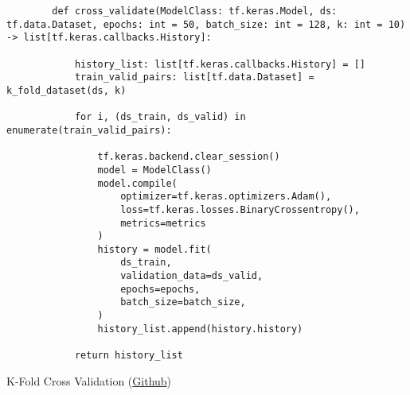 \begin{listing}[H]
        \begin{verbatim}
        def cross_validate(ModelClass: tf.keras.Model, ds: tf.data.Dataset, epochs: int = 50, batch_size: int = 128, k: int = 10) -> list[tf.keras.callbacks.History]:

            history_list: list[tf.keras.callbacks.History] = []
            train_valid_pairs: list[tf.data.Dataset] = k_fold_dataset(ds, k)
        
            for i, (ds_train, ds_valid) in enumerate(train_valid_pairs):
        
                tf.keras.backend.clear_session()
                model = ModelClass()
                model.compile(
                    optimizer=tf.keras.optimizers.Adam(),
                    loss=tf.keras.losses.BinaryCrossentropy(),
                    metrics=metrics
                )
                history = model.fit(
                    ds_train,
                    validation_data=ds_valid,
                    epochs=epochs,
                    batch_size=batch_size,
                )
                history_list.append(history.history)

            return history_list
        \end{verbatim}
    \caption{K-Fold Cross Validation (\href{https://github.com/ShenZhouHong/radiography-ai-project/blob/cf8c9e9a1f07849787a98b2fc51df690354bf194/python/common/crossvalidate.py}{Github})}\label{listing:cross-validate}
\end{listing}